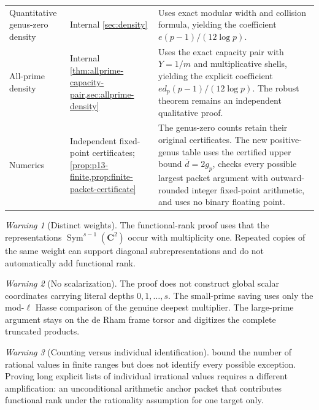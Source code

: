 \documentclass[11pt]{article}
\theoremstyle{definition}
\theoremstyle{remark}
\newtheorem{warning}[warning]{Warning}
\newcommand{\C}{\mathbf C}
\newcommand{\Sym}{\operatorname{Sym}}
\begin{document}
\begin{longtable}{@{}>{\raggedright\arraybackslash}p{}>{\raggedright\arraybackslash}p{}>{\raggedright\arraybackslash}p{}@{}}
Quantitative genus-zero density&Internal \cref{sec:density}&Uses exact modular width and collision formula, yielding the coefficient $e(p-1)/(12\log p)$.\\
All-prime density&Internal \cref{thm:allprime-capacity-pair,sec:allprime-density}&Uses the exact capacity pair with $Y=1/m$ and multiplicative shells, yielding the explicit coefficient $e d_p(p-1)/(12\log p)$.  The robust theorem remains an independent qualitative proof.\\
Numerics&Independent fixed-point certificates; \cref{prop:p13-finite,prop:finite-packet-certificate}&The genus-zero counts retain their original certificates.  The new positive-genus table uses the certified upper bound $\bar d=2g_p$, checks every possible largest packet argument with outward-rounded integer fixed-point arithmetic, and uses no binary floating point.\\
\bottomrule
\end{longtable}
\endgroup

\begin{warning}[Distinct weights]
The functional-rank proof uses that the representations
$\Sym^{s-1}(\C^2)$ occur with multiplicity one.  Repeated copies of the same
weight can support diagonal subrepresentations and do not automatically add
functional rank.
\end{warning}

\begin{warning}[No scalarization]
The proof does not construct global scalar coordinates carrying literal depths
$0,1,\ldots,s$.  The small-prime saving uses only the mod-$\ell$ Hasse
comparison of the genuine deepest multiplier.  The large-prime argument stays
on the de Rham frame torsor and digitizes the complete truncated products.
\end{warning}

\begin{warning}[Counting versus individual identification]
 bound the number of rational
values in finite ranges but
does not identify every possible exception.  Proving long explicit lists of
individual irrational values requires a different amplification: an
unconditional arithmetic anchor packet that contributes functional rank under
the rationality assumption for one target only.
\end{warning}
\end{document}

